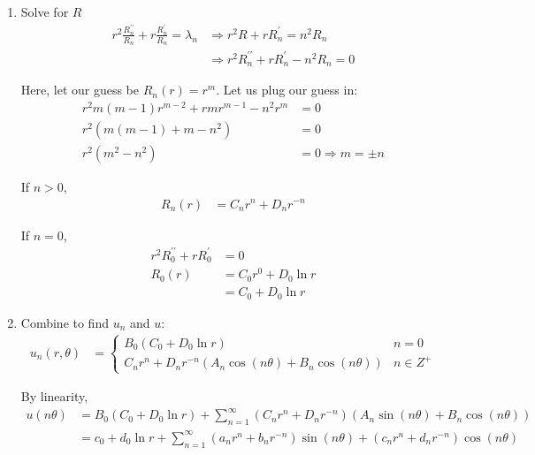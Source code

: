 \documentclass{article}
\begin{document}
\begin{enumerate}
  \item Solve for $R$
  \begin{align}
    r^2 \frac{R^{\prime\prime}_n}{R_n} + r \frac{R^\prime_n}{R_n} = \lambda_n & \Rightarrow r^2 R + rR^\prime_n = n^2 R_n\\
    & \Rightarrow r^2 R^{\prime\prime}_n + rR^\prime_n - n^2 R_n = 0
  \end{align}

  Here, let our guess be $R_n(r) = r^m$. Let us plug our guess in:
  \begin{align}
    r^2 m(m - 1)r^{m - 2} + r mr^{m - 1} - n^2 r^m & = 0\\
    r^2 \left( m(m - 1) + m - n^2 \right) & = 0\\
    r^2 \left( m^2 - n^2 \right) & = 0 \Rightarrow m = \pm n
  \end{align}

  If $n > 0$,
  \begin{align}
    R_n(r) & = C_nr^n + D_nr^{-n}
  \end{align}

  If $n = 0$,
  \begin{align}
    r^2R^{\prime\prime}_0 + rR^\prime_0 & = 0\\
    R_0(r) & = C_0 r^0 + D_0 \ln r\\
    & = C_0 + D_0 \ln r
  \end{align}
  \item Combine to find $u_n$ and $u$:
  \begin{align}
    u_n(r, \theta) & =
    \begin{cases}
      B_0( C_0 + D_0 \ln r) & n = 0\\
      C_nr^n + D_n r^{-n}\left(A_n \cos(n \theta) + B_n \cos(n \theta) \right) & n \in Z^+
    \end{cases}
  \end{align}

  By linearity,
  \begin{align}
    u(n \theta) & = B_0(C_0 + D_0 \ln r) + \sum^\infty_{n = 1} \left(C_n r^n + D_n r^{-n}\right) \left( A_n \sin(n \theta) + B_n \cos(n \theta) \right)\\
    & = c_0 + d_0 \ln r + \sum^\infty_{n = 1} (a_nr^n + b_nr^{-n}) \sin(n \theta) + (c_nr^n + d_nr^{-n}) \cos(n \theta)
  \end{align}
\end{enumerate}

\end{document}
